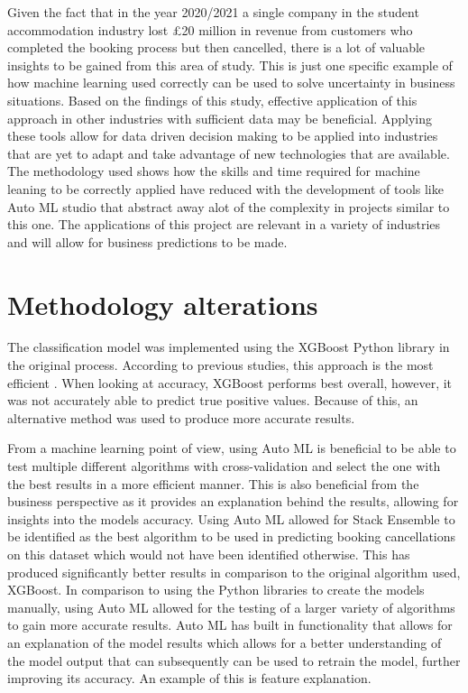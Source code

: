 Given the fact that in the year 2020/2021 a single company in the student accommodation industry lost £20 million in revenue from customers who completed the booking process but then cancelled, there is a lot of valuable insights to be gained from this area of study. This is just one specific example of how machine learning used correctly can be used to solve uncertainty in business situations. Based on the findings of this study, effective application of this approach in other industries with sufficient data may be beneficial. Applying these tools allow for data driven decision making to be applied into industries that are yet to adapt and take advantage of new technologies that are available. The methodology used shows how the skills and time required for machine leaning to be correctly applied have reduced with the development of tools like Auto ML studio that abstract away alot of the complexity in projects similar to this one. The applications of this project are relevant in a variety of industries and will allow for business predictions to be made.

\section{Methodology alterations}
 
The classification model was implemented using the XGBoost Python library in the original process. According to previous studies, this approach is the most efficient \cite{Antonio2017PredictingRevenue}. When looking at accuracy, XGBoost performs best overall, however, it was not accurately able to predict true positive values. Because of this, an alternative method was used to produce more accurate results. 

\vspace{5mm}

From a machine learning point of view, using Auto ML is beneficial to be able to test multiple different algorithms with cross-validation and select the one with the best results in a more efficient manner. This is also beneficial from the business perspective as it provides an explanation behind the results, allowing for insights into the models accuracy. Using Auto ML allowed for Stack Ensemble to be identified as the best algorithm to be used in predicting booking cancellations on this dataset which would not have been identified otherwise. This has produced significantly better results in comparison to the original algorithm used, XGBoost. In comparison to using the Python libraries to create the models manually, using Auto ML allowed for the testing of a larger variety of algorithms to gain more accurate results. Auto ML has built in functionality that allows for an explanation of the model results which allows for a better understanding of the model output that can subsequently can be used to retrain the model, further improving its accuracy. An example of this is feature explanation.

